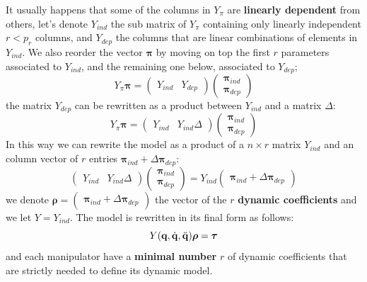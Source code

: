 \documentclass[10pt, a4paper]{report}
\newcommand{\q}{{\mathbf q}}
\begin{document}
It usually happens that some of the columns in $Y_\pi$ are \textbf{linearly dependent} from others, let's denote $Y_{ind}$ the sub matrix of $Y_{\pi}$ containing only linearly independent $r<p_r$ columns, and $Y_{dep}$ the columns that are linear combinations of elements in $Y_{ind}$. We also reorder the vector $\boldsymbol{\pi}$ by moving on top the first $r$ parameters associated to $Y_{ind}$, and the remaining one below, associated to $Y_{dep}$;\begin{equation}
    Y_\pi\boldsymbol{\pi}=\begin{pmatrix}
        Y_{ind}&Y_{dep}
    \end{pmatrix}\begin{pmatrix}
        \boldsymbol{\pi}_{ind}\\
        \boldsymbol{\pi}_{dep}
    \end{pmatrix}
\end{equation}
the matrix $Y_{dep}$ can be rewritten as a product between $Y_{ind}$ and a matrix $\Delta$:\begin{equation}
Y_\pi\boldsymbol{\pi}=\begin{pmatrix}
        Y_{ind}&Y_{ind}\Delta
    \end{pmatrix}\begin{pmatrix}
        \boldsymbol{\pi}_{ind}\\
        \boldsymbol{\pi}_{dep}
    \end{pmatrix}
\end{equation}
In this way we can rewrite the model as a product of a $n\times r$ matrix $Y_{ind}$ and an column vector of $r$ entries $ \boldsymbol{\pi}_{ind}+\Delta  \boldsymbol{\pi}_{dep}$:\begin{equation}
    \begin{pmatrix}
        Y_{ind}&Y_{ind}\Delta
    \end{pmatrix}\begin{pmatrix}
        \boldsymbol{\pi}_{ind}\\
        \boldsymbol{\pi}_{dep}
    \end{pmatrix}=Y_{ind}\begin{pmatrix}
        \boldsymbol{\pi}_{ind}+\Delta \boldsymbol{\pi}_{dep}
    \end{pmatrix}
\end{equation}
we denote $\boldsymbol{\rho}=\begin{pmatrix}
        \boldsymbol{\pi}_{ind}+\Delta \boldsymbol{\pi}_{dep}
    \end{pmatrix}$ the vector of the $r$ \textbf{dynamic coefficients} and we let $Y=Y_{ind}$.  The model is rewritten in its final form as follows:\begin{equation}
        Y(\q,\dq,\ddq)\boldsymbol{\rho}=\btau
    \end{equation}
and each manipulator have a \textbf{minimal number} $r$ of dynamic coefficients that are strictly needed to define its dynamic model.\bigskip
\end{document}
